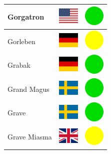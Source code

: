 \documentclass[12pt, a4paper, twoside]{report}
\begin{document}
\begin{center}
\begin{longtable}{|p{5cm}|p{2cm}|p{2cm}|}
Gorgatron & \includegraphics[width=1cm]{4x3/us} & \includegraphics[width=1cm]{likes/y} \\ \hline
Gorleben & \includegraphics[width=1cm]{4x3/de} & \includegraphics[width=1cm]{likes/m} \\ \hline
Grabak & \includegraphics[width=1cm]{4x3/de} & \includegraphics[width=1cm]{likes/y} \\ \hline
Grand Magus & \includegraphics[width=1cm]{4x3/se} & \includegraphics[width=1cm]{likes/y} \\ \hline
Grave & \includegraphics[width=1cm]{4x3/se} & \includegraphics[width=1cm]{likes/y} \\ \hline
Grave Miasma & \includegraphics[width=1cm]{4x3/gb} & \includegraphics[width=1cm]{likes/m} \\ \hline

\end{longtable}
\end{center}
\end{document}
